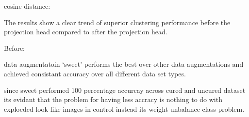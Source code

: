     \begin{table}[H]
        \centering
        \caption{Evaluation Results on Different Datasets and Augmentations with cosine distance}
        \label{tab:evaluation_results_cosine_distance}
    \end{table}
    

cosine distance:

The results show a clear trend of superior clustering performance before the projection head compared to after the projection head.

Before: 

data augmentatoin ‘sweet’ performs the best over other data augmentations and achieved consistant accuracy over all different data set types. 

since sweet performed 100 percentage accurcay across cured and uncured dataset its evidant that the problem for having less accracy is nothing
 to do with exploeded look like images in control instead its weight unbalance class problem. 

